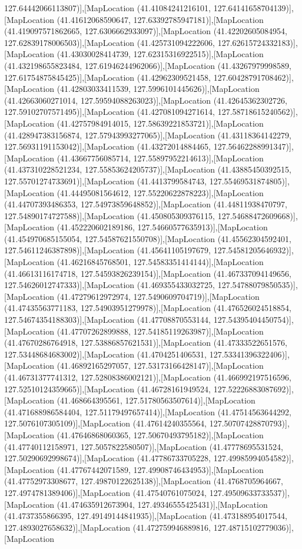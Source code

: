 127.64442066113807)],[MapLocation (41.41084241216101, 127.64141658704139)],[MapLocation (41.41612068590647, 127.63392785947181)],[MapLocation (41.419097571862665, 127.6306662933097)],[MapLocation (41.42202605084954, 127.62839178006503)],[MapLocation (41.425731094222606, 127.62615724332183)],[MapLocation (41.43030028414739, 127.62315316922515)],[MapLocation (41.432198655823484, 127.61946244962066)],[MapLocation (41.43267979998589, 127.61754875845425)],[MapLocation (41.42962309521458, 127.60428791708462)],[MapLocation (41.42803033411539, 127.5996101445626)],[MapLocation (41.42663060271014, 127.59594088263023)],[MapLocation (41.42645362302726, 127.59102707571495)],[MapLocation (41.427081094271614, 127.58718615240562)],[MapLocation (41.42757984914015, 127.58639221853721)],[MapLocation (41.428947383156874, 127.57943993277065)],[MapLocation (41.43118364142279, 127.56931191153042)],[MapLocation (41.43272014884465, 127.56462288991347)],[MapLocation (41.43667756085714, 127.55897952214613)],[MapLocation (41.437310228521234, 127.55853624205737)],[MapLocation (41.43885450392515, 127.55701274733691)],[MapLocation (41.4413799584743, 127.55469531874805)],[MapLocation (41.44495081564612, 127.55220622878223)],[MapLocation (41.44707393486353, 127.54973859648852)],[MapLocation (41.44811938470797, 127.54890174727588)],[MapLocation (41.450805309376115, 127.54688472609668)],[MapLocation (41.452220602189186, 127.54660577635913)],[MapLocation (41.454970685155054, 127.54587621550708)],[MapLocation (41.45562304592401, 127.54611246387898)],[MapLocation (41.45641105197679, 127.54581205646932)],[MapLocation (41.46216845768501, 127.54583351414144)],[MapLocation (41.46613116174718, 127.54593826239154)],[MapLocation (41.467337094149656, 127.54626012747333)],[MapLocation (41.469355433032725, 127.54788079850535)],[MapLocation (41.47279612972974, 127.5490609704719)],[MapLocation (41.47435563771183, 127.54903951279978)],[MapLocation (41.476526024518854, 127.54674354188303)],[MapLocation (41.47708870553144, 127.54395404450754)],[MapLocation (41.47707262899888, 127.54185119263987)],[MapLocation (41.47670286764918, 127.53886857621531)],[MapLocation (41.47333522651576, 127.53448684683002)],[MapLocation (41.4704251406531, 127.53341396322406)],[MapLocation (41.46892165297057, 127.53173166428147)],[MapLocation (41.46731377741312, 127.52808386002121)],[MapLocation (41.466992197516596, 127.52510124359665)],[MapLocation (41.46728161949524, 127.52226883087692)],[MapLocation (41.468664395561, 127.51780563507614)],[MapLocation (41.471688986584404, 127.51179497657414)],[MapLocation (41.47514563644292, 127.5076107305109)],[MapLocation (41.47614240355564, 127.50707428870793)],[MapLocation (41.47646868060365, 127.50670493795182)],[MapLocation (41.47740112158971, 127.5057822580507)],[MapLocation (41.47778695531524, 127.50290692998674)],[MapLocation (41.47786733705228, 127.49985994054582)],[MapLocation (41.47767442071589, 127.49908746434953)],[MapLocation (41.47752973308677, 127.49870122625138)],[MapLocation (41.4768705964667, 127.4974781389406)],[MapLocation (41.47540761075024, 127.49509633733537)],[MapLocation (41.474635912673904, 127.49346555425431)],[MapLocation (41.4737355866395, 127.49149144841935)],[MapLocation (41.473188954017544, 127.4893027658632)],[MapLocation (41.472759946889816, 127.48715102779036)],[MapLocation 